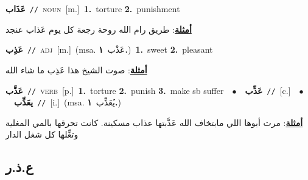 \documentclass[10pt,a4paper,twoside]{article} %
\begin{document}
\begin{multicols}{2}
{\setlength\topsep{0pt}\textbf{\foreignlanguage{arabic}{عَذَاب}}\ {\color{gray}\texttt{//}\color{black}}\ \textsc{noun}\ [m.]\ \textbf{1.}~torture  \textbf{2.}~punishment\  \begin{flushright}\color{gray}\foreignlanguage{arabic}{\textbf{\underline{\foreignlanguage{arabic}{أمثلة}}}: طريق رام الله روحة رجعة كل يوم عَذاب عنجد}\end{flushright}\color{black}} \vspace{2mm}

{\setlength\topsep{0pt}\textbf{\foreignlanguage{arabic}{عَذِب}}\ {\color{gray}\texttt{//}\color{black}}\ \textsc{adj}\ [m.]\ \color{gray}(msa. \foreignlanguage{arabic}{عَذْب}~\foreignlanguage{arabic}{\textbf{١.}})\color{black}\ \textbf{1.}~sweet  \textbf{2.}~pleasant\  \begin{flushright}\color{gray}\foreignlanguage{arabic}{\textbf{\underline{\foreignlanguage{arabic}{أمثلة}}}: صوت الشيخ هذا عَذِب ما شاء الله}\end{flushright}\color{black}} \vspace{2mm}

{\setlength\topsep{0pt}\textbf{\foreignlanguage{arabic}{عَذَّب}}\ {\color{gray}\texttt{//}\color{black}}\ \textsc{verb}\ [p.]\ \textbf{1.}~torture  \textbf{2.}~punish  \textbf{3.}~make sb suffer\ \ $\bullet$\ \ \setlength\topsep{0pt}\textbf{\foreignlanguage{arabic}{عَذِّب}}\ {\color{gray}\texttt{//}\color{black}}\ [c.]\ \ $\bullet$\ \ \setlength\topsep{0pt}\textbf{\foreignlanguage{arabic}{يعَذِّب}}\ {\color{gray}\texttt{//}\color{black}}\ [i.]\ \color{gray}(msa. \foreignlanguage{arabic}{يُعَذِّب}~\foreignlanguage{arabic}{\textbf{١.}})\color{black}\  \begin{flushright}\color{gray}\foreignlanguage{arabic}{\textbf{\underline{\foreignlanguage{arabic}{أمثلة}}}: مرت أبوها اللي مابتخاف الله عَذَّبتها عذاب مسكينة. كانت تحرقها بالمي المغلية وتغِّلها كل شغل الدار}\end{flushright}\color{black}} \vspace{2mm}

\vspace{-3mm}
\subsection*{\color{blue}\foreignlanguage{arabic}{ع.ذ.ر}\color{blue}{}} 


\end{multicols}
\end{document}
